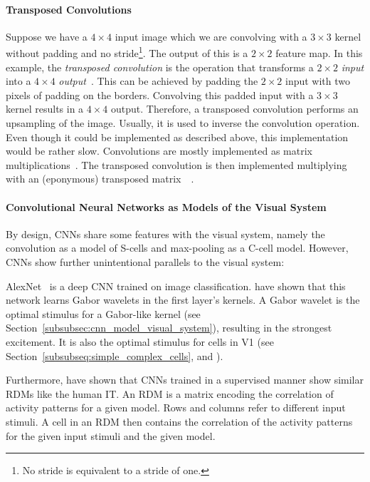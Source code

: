 \paragraph{Transposed Convolutions}
Suppose we have a $4\times 4$ input image which we are convolving with a $3\times 3$ kernel without padding and no stride\footnote{No stride is equivalent to a stride of one.}.
The output of this is a $2\times 2$ feature map.
In this example, the \textit{transposed convolution} is the operation that transforms a $2\times 2$ \textit{input} into a $4\times 4$ \textit{output}~\citep{dumoulin2016guide}.
This can be achieved by padding the $2\times 2$ input with two pixels of padding on the borders.
Convolving this padded input with a $3\times 3$ kernel results in a $4\times 4$ output.
Therefore, a transposed convolution performs an upsampling of the image.
Usually, it is used to inverse the convolution operation.
Even though it could be implemented as described above, this implementation would be rather slow.
Convolutions are mostly implemented as matrix multiplications~\citep{georganas2018anatomy}.
The transposed convolution is then implemented multiplying with an (eponymous) transposed matrix~~\citep{dumoulin2016guide}.

\paragraph{Convolutional Neural Networks as Models of the Visual System}
By design, \acp{CNN} share some features with the visual system, namely the convolution as a model of S-cells and max-pooling as a C-cell model.
However, \acp{CNN} show further unintentional parallels to the visual system:

AlexNet~\citep{krizhevsky2012imagenet} is a deep \ac{CNN} trained on image classification.
\citet{krizhevsky2012imagenet} have shown that this network learns Gabor wavelets in the first layer's kernels.
A Gabor wavelet is the optimal stimulus for a Gabor-like kernel (see Section~\ref{subsubsec:cnn_model_visual_system}), resulting in the strongest excitement.
It is also the optimal stimulus for cells in \ac{V1} (see Section~\ref{subsubseq:simple_complex_cells}, and \citet{jones1987evaluation}).

Furthermore, \citet{khaligh2014deep} have shown that \acp{CNN} trained in a supervised manner show similar \acp{RDM} like the human \ac{IT}.
An \ac{RDM} is a matrix encoding the correlation of activity patterns for a given model.
Rows and columns refer to different input stimuli.
A cell in an \ac{RDM} then contains the correlation of the activity patterns for the given input stimuli and the given model.

